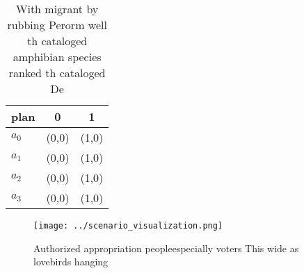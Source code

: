 \documentclass[a4paper]{article}
\begin{document}
\begin{table}
\begin{adjustbox}{width=0.7\columnwidth}
\begin{tabular}{|l|l|l|}
\hline
\textbf{plan} & \multicolumn{1}{c|}{\textbf{0}} & \multicolumn{1}{c|}{\textbf{1}} \\ \hline
\textbf{$a_0$}  & (0,0) & (1,0) \\ \hline
\textbf{$a_1$}  & (0,0) & (1,0) \\ \hline
\textbf{$a_2$}  & (0,0) & (1,0) \\ \hline
\textbf{$a_3$}  & (0,0) & (1,0) \\ \hline
\end{tabular}
\end{adjustbox}
\caption{With migrant by rubbing Perorm well th cataloged amphibian species ranked th cataloged De
}
\end{table}

\begin{figure}
\centering
\texttt{[image: ../scenario\_visualization.png]}
\caption{Authorized appropriation peopleespecially voters This wide as lovebirds hanging
}
\end{figure}
 
\end{document}
